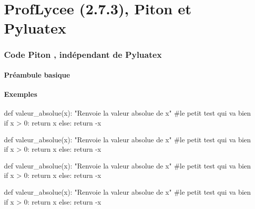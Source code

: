 \documentclass[french,a4paper,10pt]{article}
\def\PLver{2.7.3}
\begin{document}
\part*{ProfLycee (\PLver), Piton et Pyluatex}

\section{Code \og Piton \fg{}, indépendant de Pyluatex}

\subsection{Préambule basique}

{\small {}}

\subsection{Exemples}

{\small \begin{codehigh}
\begin{CodePiton}{}
def valeur_absolue(x):
    "Renvoie la valeur absolue de x"
    #le petit test qui va bien
    if x > 0:
        return x
    else:
    return -x
\end{CodePiton}
\end{codehigh}}

\begin{CodePiton}{}
def valeur_absolue(x):
	"Renvoie la valeur absolue de x"
	#le petit test qui va bien
	if x > 0:
		return x
	else:
		return -x
\end{CodePiton}

{\small \begin{codehigh}
\begin{CodePiton}[Style=Classique,Largeur=10cm]{}
def valeur_absolue(x):
    "Renvoie la valeur absolue de x"
    #le petit test qui va bien
    if x > 0:
        return x
    else:
    return -x
\end{CodePiton}
\end{codehigh}}

\begin{CodePiton}[Style=Classique,Largeur=10cm]{}
def valeur_absolue(x):
	"Renvoie la valeur absolue de x"
	#le petit test qui va bien
	if x > 0:
		return x
	else:
		return -x
\end{CodePiton}
\end{document}
